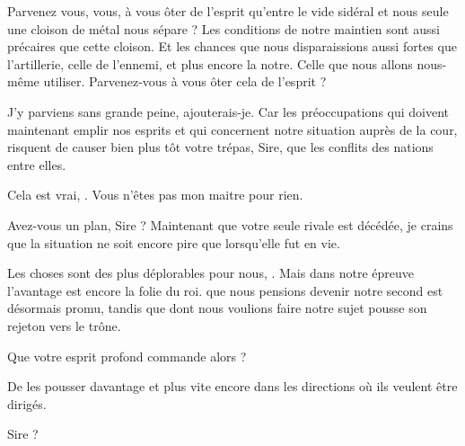 \begin{drama}
  Parvenez vous, vous, à vous ôter de l’esprit qu’entre le vide sidéral et nous seule une cloison de métal nous sépare ? Les conditions de notre maintien sont aussi précaires que cette cloison. Et les chances que nous disparaissions aussi fortes que l’artillerie, celle de l’ennemi, et plus encore la notre. Celle que nous allons nous-même utiliser. Parvenez-vous à vous ôter cela de l’esprit ?

  \alexasspeaks J’y parviens sans grande peine,  ajouterais-je. Car les préoccupations qui doivent maintenant emplir nos esprits et qui concernent notre situation auprès de la cour, risquent de causer bien plus tôt votre trépas, Sire, que les conflits des nations entre elles.

  \elenaspeaks Cela est vrai, \alexas. Vous n’êtes pas mon maitre pour rien.

  \alexasspeaks Avez-vous un plan, Sire ? Maintenant que votre seule rivale est décédée, je crains que la situation ne soit encore pire que lorsqu’elle fut en vie.

  \elenaspeaks Les choses sont des plus déplorables pour nous, \alexas. Mais dans notre épreuve l’avantage est encore la folie du roi. \general{} que nous pensions devenir notre second est désormais promu, tandis que \reine{} dont nous voulions faire notre sujet pousse son rejeton vers le trône.

  \alexasspeaks Que votre esprit profond commande alors ?

  \elenaspeaks De les pousser davantage et plus vite encore dans les directions où ils veulent être dirigés.


  \alexasspeaks {} Sire ?
\end{drama}


\scene

\StageDirII{\elena, \general}


